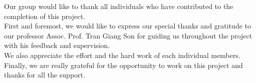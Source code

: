 \noindent Our group would like to thank all individuals who have contributed to the completion of this project. \\

First and foremost, we would like to express our special thanks and gratitude to our professor Assoc. Prof. Tran Giang Son for guiding us throughout the project with his feedback and supervision. \\

We also appreciate the effort and the hard work of each individual members. \\

Finally, we are really grateful for the opportunity to work on this project and thanks for all the support. 







